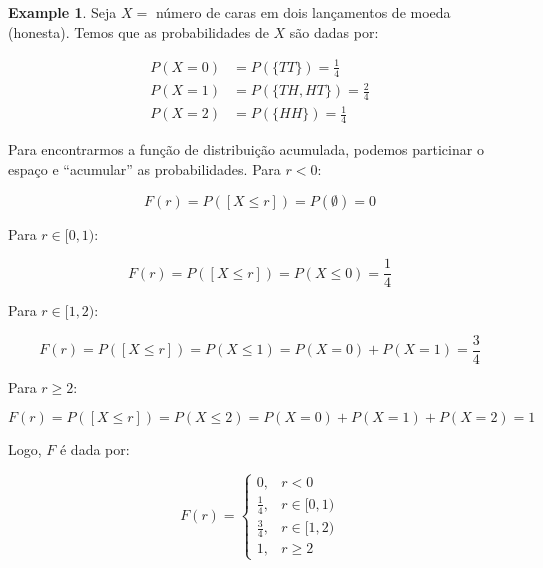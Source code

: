 \documentclass[
]{article}
\theoremstyle{definition}
\theoremstyle{definition}
\newtheorem{example}{Example}[section]
\theoremstyle{definition}
\theoremstyle{definition}
\theoremstyle{remark}
\begin{document}
\begin{example}

Seja \(X =\) número de caras em dois lançamentos de moeda (honesta). Temos que as probabilidades de \(X\) são dadas por:

\begin{align*}
P(X = 0) &= P(\{TT\}) = \frac{1}{4} \\
P(X = 1) &= P(\{TH,HT\}) = \frac{2}{4} \\
P(X = 2) &= P(\{HH\}) = \frac{1}{4}
\end{align*}

Para encontrarmos a função de distribuição acumulada, podemos particinar o espaço e ``acumular'' as probabilidades. Para \(r < 0\):

\begin{equation*}
F(r) = P([X \le r]) = P(\emptyset) = 0
\end{equation*}

Para \(r \in [0,1)\):

\begin{equation*}
F(r) = P([X \le r]) = P(X \le 0) = \frac{1}{4}
\end{equation*}

Para \(r \in [1,2)\):

\begin{equation*}
F(r) = P([X \le r]) = P(X \le 1) = P(X = 0) + P(X = 1) = \frac{3}{4}
\end{equation*}

Para \(r \ge 2\):

\begin{equation*}
F(r) = P([X \le r]) = P(X \le 2) = P(X = 0) + P(X = 1) + P(X = 2) = 1
\end{equation*}

Logo, \(F\) é dada por:

\begin{equation*}
F(r) = \begin{cases} 0, & r<0 \\ \frac{1}{4}, & r \in [0,1) \\ \frac{3}{4}, & r \in [1,2) \\ 1, & r \ge 2 \end{cases}
\end{equation*}



\end{example}
\end{document}
